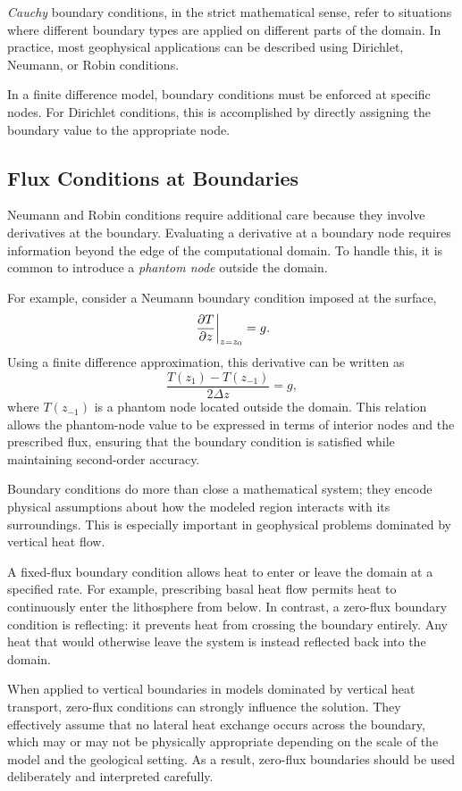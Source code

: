 \emph{Cauchy} boundary conditions, in the strict mathematical sense, refer to situations where different boundary types are applied on different parts of the domain. In practice, most geophysical applications can be described using Dirichlet, Neumann, or Robin conditions.

In a finite difference model, boundary conditions must be enforced at specific
nodes. For Dirichlet conditions, this is accomplished by directly assigning
the boundary value to the appropriate node.

\subsection{Flux Conditions at Boundaries}

Neumann and Robin conditions require additional care because they involve derivatives at the boundary. Evaluating a derivative at a boundary node requires information beyond the edge of the computational domain. To handle this, it is common to introduce a \emph{phantom node} outside the domain.

For example, consider a Neumann boundary condition imposed at the surface,
\[
    \left.\pdv{T}{z}\right|_{z=z_0} = g.
\]
Using a finite difference approximation, this derivative can be written as
\[
    \frac{T(z_1) - T(z_{-1})}{2\Delta z} = g,
\]
where $T(z_{-1})$ is a phantom node located outside the domain. This relation allows the phantom-node value to be expressed in terms of interior nodes and the prescribed flux, ensuring that the boundary condition is satisfied while maintaining second-order accuracy.

Boundary conditions do more than close a mathematical system; they encode physical assumptions about how the modeled region interacts with its surroundings. This is especially important in geophysical problems dominated by vertical heat flow.

A fixed-flux boundary condition allows heat to enter or leave the domain at a specified rate. For example, prescribing basal heat flow permits heat to continuously enter the lithosphere from below. In contrast, a zero-flux boundary condition is reflecting: it prevents heat from crossing the boundary entirely. Any heat that would otherwise leave the system is instead reflected back into the domain.

When applied to vertical boundaries in models dominated by vertical heat transport, zero-flux conditions can strongly influence the solution. They effectively assume that no lateral heat exchange occurs across the boundary, which may or may not be physically appropriate depending on the scale of the model and the geological setting. As a result, zero-flux boundaries should be used deliberately and interpreted carefully.

